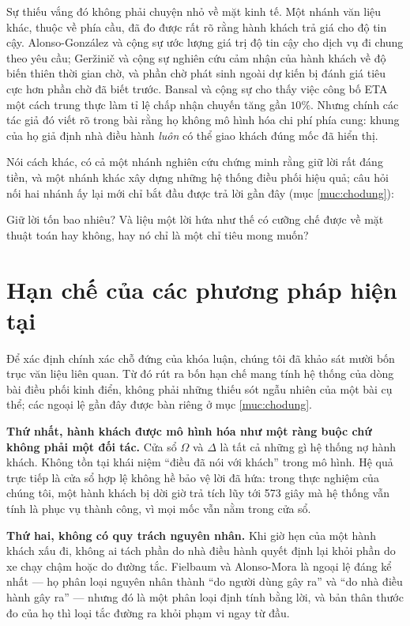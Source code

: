 Sự thiếu vắng đó không phải chuyện nhỏ về mặt kinh tế. Một nhánh văn liệu khác, thuộc về phía
cầu, đã đo được rất rõ rằng hành khách trả giá cho độ tin cậy. Alonso-González và cộng sự
\cite{alonsogonzalez2020} ước lượng giá trị độ tin cậy cho dịch vụ đi chung theo yêu cầu;
Geržinič và cộng sự \cite{gerzinic2023} nghiên cứu cảm nhận của hành khách về độ biến thiên
thời gian chờ, và phần chờ phát sinh ngoài dự kiến bị đánh giá tiêu cực hơn phần chờ đã biết
trước.
Bansal và cộng sự \cite{bansal2019} cho thấy việc công bố ETA một cách trung thực làm tỉ lệ
chấp nhận chuyến tăng gần $10\%$. Nhưng chính các tác giả đó viết rõ trong bài rằng họ không
mô hình hóa chi phí phía cung: khung của họ giả định nhà điều hành \emph{luôn} có thể giao
khách đúng mốc đã hiển thị.

Nói cách khác, có cả một nhánh nghiên cứu chứng minh rằng giữ lời rất đáng tiền, và một nhánh
khác xây dựng những hệ thống điều phối hiệu quả; câu hỏi nối hai nhánh ấy lại mới chỉ bắt đầu
được trả lời gần đây (mục \ref{muc:chodung}):

\begin{khungy}
Giữ lời tốn bao nhiêu? Và liệu một lời hứa như thế có cưỡng chế được về mặt thuật toán hay
không, hay nó chỉ là một chỉ tiêu mong muốn?
\end{khungy}

\section{Hạn chế của các phương pháp hiện tại}

Để xác định chính xác chỗ đứng của khóa luận, chúng tôi đã khảo sát mười bốn trục văn liệu liên
quan. Từ đó rút ra bốn hạn chế mang tính hệ thống của dòng bài điều phối kinh điển, không phải
những thiếu sót ngẫu nhiên của một bài cụ thể; các ngoại lệ gần đây được bàn riêng ở mục
\ref{muc:chodung}.

\textbf{Thứ nhất, hành khách được mô hình hóa như một ràng buộc chứ không phải một đối tác.}
Cửa sổ $\Omega$ và $\Delta$ là tất cả những gì hệ thống nợ hành khách. Không tồn tại khái niệm
``điều đã nói với khách'' trong mô hình. Hệ quả trực tiếp là cửa sổ hợp lệ không hề bảo vệ lời
đã hứa: trong thực nghiệm của chúng tôi, một hành khách bị dời giờ trả tích lũy tới 573 giây
mà hệ thống vẫn tính là phục vụ thành công, vì mọi mốc vẫn nằm trong cửa sổ.

\textbf{Thứ hai, không có quy trách nguyên nhân.} Khi giờ hẹn của một hành khách xấu đi, không
ai tách phần do nhà điều hành quyết định lại khỏi phần do xe chạy chậm hoặc do đường tắc.
Fielbaum và Alonso-Mora \cite{fielbaum2020} là ngoại lệ đáng kể nhất --- họ phân loại nguyên
nhân thành ``do người dùng gây ra'' và ``do nhà điều hành gây ra'' --- nhưng đó là một phân
loại định tính bằng lời, và bản thân thước đo của họ thì loại tắc đường ra khỏi phạm vi ngay
từ đầu.

